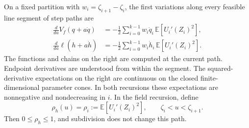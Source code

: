\begin{lemma}
\label{var:variation}
On a fixed partition with $w_i=\zeta_{i+1}-\zeta_i$, the first
variations along every feasible line segment of step paths are
\begin{align}
\label{var:pattern-variation}
 \frac{d}{da}V_f(q+a\dot q)
 &=-\frac12\sum_{i=0}^{k-1}w_i\dot q_i\,
   \mathbb E[U_i'(Z_i)^2],\\
\label{var:field-variation}
 \frac{d}{da}\ell(h+a\dot h)
 &=-\frac12\sum_{i=0}^{k-1}w_i\dot h_i\,
   \mathbb E[U_i'(Z_i)^2].
\end{align}
The functions and chains on the right are computed at the current
path. Endpoint derivatives are understood from within the segment.
The squared-derivative expectations on the right are continuous on the
closed finite-dimensional parameter cones. In both recursions these
expectations are nonnegative and nondecreasing in $i$. In the field
recursion, define
\begin{equation}
\label{var:rho}
 \rho_h(u)=\rho_i:=\mathbb E[U_i'(Z_i)^2],
 \qquad \zeta_i<u<\zeta_{i+1}.
\end{equation}
Then $0\le\rho_h\le1$, and subdivision does not change this path.
\end{lemma}


